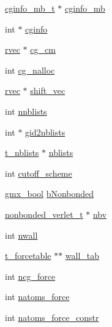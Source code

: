 \begin{DoxyCompactItemize}
\item 
\hyperlink{structcginfo__mb__t}{cginfo\-\_\-mb\-\_\-t} $\ast$ \hyperlink{structt__forcerec_a20a77df43151b7822c57237099b1f372}{cginfo\-\_\-mb}
\item 
int $\ast$ \hyperlink{structt__forcerec_a7fcab58d208f2669da2cbe9b53cc491b}{cginfo}
\item 
\hyperlink{share_2template_2gromacs_2types_2simple_8h_aa02a552a4abd2f180c282a083dc3a999}{rvec} $\ast$ \hyperlink{structt__forcerec_a2ccaa84a2329f3026997ab659e8a0f3c}{cg\-\_\-cm}
\item 
int \hyperlink{structt__forcerec_ac2671b4a04a8f60f7fa3caa300596f0b}{cg\-\_\-nalloc}
\item 
\hyperlink{share_2template_2gromacs_2types_2simple_8h_aa02a552a4abd2f180c282a083dc3a999}{rvec} $\ast$ \hyperlink{structt__forcerec_a5e9731bed3442af56ecb4e8179d85abc}{shift\-\_\-vec}
\item 
int \hyperlink{structt__forcerec_a49b4684b62ba07d21a9f59169094bbd2}{nnblists}
\item 
int $\ast$ \hyperlink{structt__forcerec_a23b6ff5757ba0f0df1cba2530fe8ed15}{gid2nblists}
\item 
\hyperlink{structt__nblists}{t\-\_\-nblists} $\ast$ \hyperlink{structt__forcerec_a2d8a474e61d6ace4d307be369371b3da}{nblists}
\item 
int \hyperlink{structt__forcerec_a20dfdc20cd7fbc1ec65a1bafa1c0e2b9}{cutoff\-\_\-scheme}
\item 
\hyperlink{include_2types_2simple_8h_a8fddad319f226e856400d190198d5151}{gmx\-\_\-bool} \hyperlink{structt__forcerec_aee4a91f2c5a493d84c40339452de7a2c}{b\-Nonbonded}
\item 
\hyperlink{structnonbonded__verlet__t}{nonbonded\-\_\-verlet\-\_\-t} $\ast$ \hyperlink{structt__forcerec_a088f07ad4b225a0d4e56624aa3543a7f}{nbv}
\item 
int \hyperlink{structt__forcerec_a97235693f04d1ca106ceaa98e0e13dab}{nwall}
\item 
\hyperlink{structt__forcetable}{t\-\_\-forcetable} $\ast$$\ast$ \hyperlink{structt__forcerec_a1416b8232abf92a77418d02e80eec50b}{wall\-\_\-tab}
\item 
int \hyperlink{structt__forcerec_a152b71a33a12b8150c0f5ff890dc33f3}{ncg\-\_\-force}
\item 
int \hyperlink{structt__forcerec_a56e800a576441c8af51f44785915b6bf}{natoms\-\_\-force}
\item 
int \hyperlink{structt__forcerec_aea484dc8d7d5cb71aedbf058bc1051f0}{natoms\-\_\-force\-\_\-constr}
\item 
$$
\end{DoxyCompactItemize}
